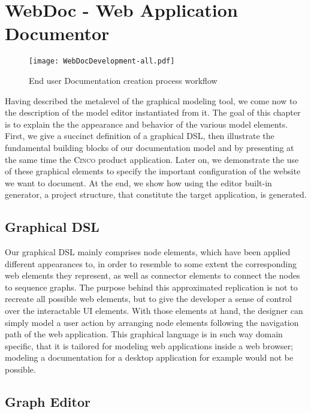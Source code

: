 \chapter{WebDoc - Web Application Documentor}\label{ch:CP}

\begin{figure}[h]
    \centering
    \texttt{[image: WebDocDevelopment-all.pdf]}
    \caption{End user Documentation creation process workflow}
    \label{fig:procWorkflow}
\end{figure}

Having described the metalevel of the graphical modeling tool, we come now to the description of the model editor instantiated from it. The goal of this chapter is to explain the the appearance and behavior of the various model elements. First, we give a succinct definition of a graphical DSL, then illustrate the fundamental building blocks of our documentation model and by presenting at the same time the \textsc{Cinco} product application. Later on, we demonstrate the use of these graphical elements to specify the important configuration of the website we want to document. At the end, we show how using the editor built-in generator, a project structure, that constitute the target application, is generated.

\section{Graphical DSL}\label{sec:gDSL}

Our graphical DSL mainly comprises node elements, which have been applied different appearances to, in order to resemble to some extent the corresponding web elements they represent, as well as connector elements to connect the nodes to sequence graphs. The purpose behind this approximated replication is not to recreate all possible web elements, but to give the developer a sense of control over the interactable UI elements. With those elements at hand, the designer can simply model a user action by arranging node elements following the navigation path of the web application. This graphical language is in such way domain specific, that it is tailored for modeling web applications inside a web browser; modeling a documentation for a desktop application for example would not be possible.

\section{Graph Editor}\label{sec:graphEditor}

